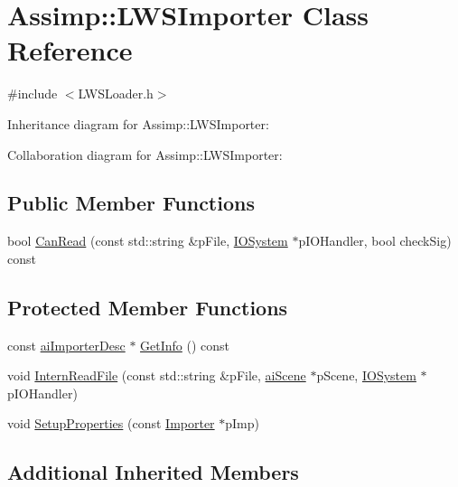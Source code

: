 \hypertarget{class_assimp_1_1_l_w_s_importer}{\section{Assimp\+:\+:L\+W\+S\+Importer Class Reference}
\label{class_assimp_1_1_l_w_s_importer}
}


{\ttfamily \#include $<$L\+W\+S\+Loader.\+h$>$}



Inheritance diagram for Assimp\+:\+:L\+W\+S\+Importer\+:


Collaboration diagram for Assimp\+:\+:L\+W\+S\+Importer\+:
\subsection*{Public Member Functions}
\begin{DoxyCompactItemize}
\item 
bool \hyperlink{class_assimp_1_1_l_w_s_importer_ad47febdbe3d1c2f64207d9d6ae74459c}{Can\+Read} (const std\+::string \&p\+File, \hyperlink{class_assimp_1_1_i_o_system}{I\+O\+System} $\ast$p\+I\+O\+Handler, bool check\+Sig) const 
\end{DoxyCompactItemize}
\subsection*{Protected Member Functions}
\begin{DoxyCompactItemize}
\item 
const \hyperlink{structai_importer_desc}{ai\+Importer\+Desc} $\ast$ \hyperlink{class_assimp_1_1_l_w_s_importer_ad8facb61d246c1829d0f66b47e068e15}{Get\+Info} () const 
\item 
void \hyperlink{class_assimp_1_1_l_w_s_importer_a8d456bbf90dd0171a9510a1089d68c45}{Intern\+Read\+File} (const std\+::string \&p\+File, \hyperlink{structai_scene}{ai\+Scene} $\ast$p\+Scene, \hyperlink{class_assimp_1_1_i_o_system}{I\+O\+System} $\ast$p\+I\+O\+Handler)
\item 
void \hyperlink{class_assimp_1_1_l_w_s_importer_ad3192a55e03c2660835d8f5d790014e6}{Setup\+Properties} (const \hyperlink{class_assimp_1_1_importer}{Importer} $\ast$p\+Imp)
\end{DoxyCompactItemize}
\subsection*{Additional Inherited Members}


